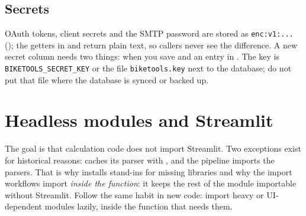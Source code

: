\subsection*{Secrets}

OAuth tokens, client secrets and the SMTP password are stored as \texttt{enc:v1:...} (); the
getters in  and  return plain text, so callers never see the difference. A new
secret column needs two things:  when you save and an entry in . The key is
\texttt{BIKETOOLS\_SECRET\_KEY} or the file \texttt{biketools.key} next to the database; do not put that file where
the database is synced or backed up.

\section{Headless modules and Streamlit}\label{sec:headless}

The goal is that calculation code does not import Streamlit. Two exceptions exist for historical reasons:
 caches its parser with , and the pipeline imports the parsers. That is why
 installs stand-ins for missing libraries and why the import workflows import
 \emph{inside the function}: it keeps the rest of the module importable without Streamlit.
Follow the same habit in new code: import heavy or UI-dependent modules lazily, inside the function that needs them.
